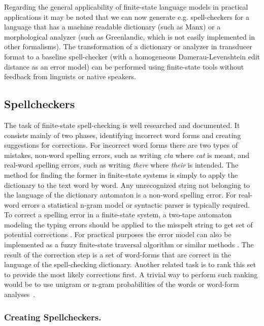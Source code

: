 \documentclass{llncs}
\begin{document}
Regarding the general applicability of finite-state
language models in practical applications it may be noted that we can now generate
e.g. spell-checkers for a language that has a machine
readable dictionary (such as Manx) or a morphological analyzer (such as
Greenlandic, which is not easily implemented in other formalisms). 
The transformation of a dictionary or analyzer in transducer format 
to a baseline spell-checker (with a homogeneous 
Damerau-Levenshtein edit distance as an error model) can be performed using finite-state tools 
without  feedback from linguists or native speakers.

\subsection{Spellcheckers}

The task of finite-state spell-checking is well researched and documented. It
consists mainly of two phases, identifying incorrect word forms and creating
suggestions for corrections. For incorrect word forms there are two types of
mistakes, non-word spelling errors, such as writing \emph{cta} where \emph{cat}
is meant, and real-word spelling errors, such as writing \emph{there} where
\emph{their} is intended. The method for finding the former in finite-state systems
is simply to apply the dictionary to the text word by word. Any unrecognized
string not belonging to the language of the dictionary automaton is a non-word
spelling error. For real-word errors a statistical n-gram model or syntactic
parser is typically required. To correct a spelling error in a finite-state
system, a two-tape automaton modeling the typing errors should be applied to
the misspelt string to get set of potential corrections \cite{pirinen/2010/lrec}.
For practical purposes the error model can also be implemented as a
fuzzy finite-state traversal algorithm or similar methods \cite{oflazer/1996}. The result
of the correction step is a set of word-forms that are correct in the
language of the spell-checking dictionary. Another related task is to rank this
set to provide the most likely corrections first.
A trivial way to perform such ranking would be to use
unigram \cite{pirinen/2010/lrec} or n-gram probabilities of the words 
\cite{mays/1991} or word-form analyses~\cite{pirinen/2012/cicling}.

\subsubsection{Creating Spellcheckers.}
\end{document}
